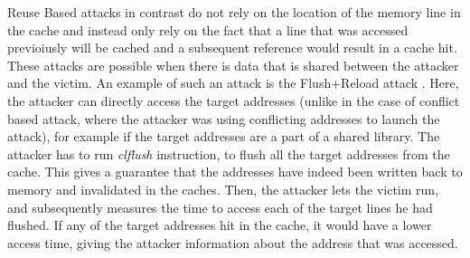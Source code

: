 Reuse Based attacks in contrast do not rely on the location of the memory line in the cache and instead only rely on the fact that a line that was accessed previoiusly will be cached and a subsequent reference would result in a cache hit. These attacks are possible when there is data that is shared between the attacker and the victim. An example of such an attack is the Flush+Reload attack \cite{yarom2014flush+}. Here, the attacker can directly access the target addresses (unlike in the case of conflict based attack, where the attacker was using conflicting addresses to launch the attack), for example if the target addresses are a part of a shared library. The attacker has to run \textit{clflush} \cite{guide2016intel} instruction, to flush all the target addresses from the cache. This gives a guarantee that the addresses have indeed been written back to memory and invalidated in the caches. Then, the attacker lets the victim run, and subsequently measures the time to access each of the target lines he had flushed. If any of the target addresses hit in the cache, it would have a lower access time, giving the attacker information about the address that was accessed.   
